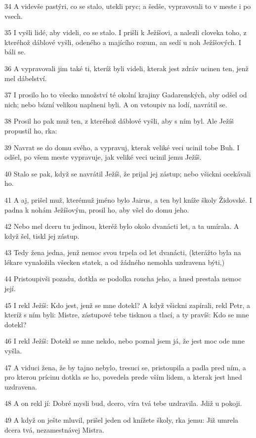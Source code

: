 \par 34 A videvše pastýri, co se stalo, utekli pryc; a šedše, vypravovali to v meste i po vsech.
\par 35 I vyšli lidé, aby videli, co se stalo. I prišli k Ježíšovi, a nalezli cloveka toho, z kteréhož dáblové vyšli, odeného a majícího rozum, an sedí u noh Ježíšových. I báli se.
\par 36 A vypravovali jim také ti, kteríž byli videli, kterak jest zdráv ucinen ten, jenž mel dábelství.
\par 37 I prosilo ho to všecko množství té okolní krajiny Gadarenských, aby odšel od nich; nebo bázní velikou naplneni byli. A on vstoupiv na lodí, navrátil se.
\par 38 Prosil ho pak muž ten, z kteréhož dáblové vyšli, aby s ním byl. Ale Ježíš propustil ho, rka:
\par 39 Navrat se do domu svého, a vypravuj, kterak veliké veci ucinil tobe Buh. I odšel, po všem meste vypravuje, jak veliké veci ucinil jemu Ježíš.
\par 40 Stalo se pak, když se navrátil Ježíš, že prijal jej zástup; nebo všickni ocekávali ho.
\par 41 A aj, prišel muž, kterémuž jméno bylo Jairus, a ten byl kníže školy Židovské. I padna k nohám Ježíšovým, prosil ho, aby všel do domu jeho.
\par 42 Nebo mel dceru tu jedinou, kteréž bylo okolo dvanácti let, a ta umírala. A když šel, tiskl jej zástup.
\par 43 Tedy žena jedna, jenž nemoc svou trpela od let dvanácti, (kterážto byla na lékare vynaložila všecken statek, a od žádného nemohla uzdravena býti,)
\par 44 Pristoupivši pozadu, dotkla se podolka roucha jeho, a hned prestala nemoc její.
\par 45 I rekl Ježíš: Kdo jest, jenž se mne dotekl? A když všickni zapírali, rekl Petr, a kteríž s ním byli: Mistre, zástupové tebe tisknou a tlací, a ty pravíš: Kdo se mne dotekl?
\par 46 I rekl Ježíš: Dotekl se mne nekdo, nebo poznal jsem já, že jest moc ode mne vyšla.
\par 47 A viduci žena, že by tajno nebylo, tresuci se, pristoupila a padla pred ním, a pro kterou prícinu dotkla se ho, povedela prede vším lidem, a kterak jest hned uzdravena.
\par 48 A on rekl jí: Dobré mysli bud, dcero, víra tvá tebe uzdravila. Jdiž u pokoji.
\par 49 A když on ješte mluvil, prišel jeden od knížete školy, rka jemu: Již umrela dcera tvá, nezamestnávej Mistra.
